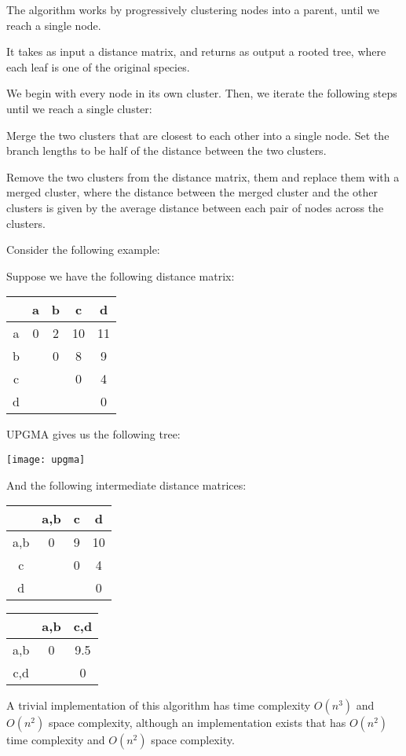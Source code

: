 \begin{enumerate}[label=(\alph*)]
The algorithm works by progressively clustering nodes into a parent, until we reach a single node.

It takes as input a distance matrix, and returns as output a rooted tree, where each leaf is one of the original species.

We begin with every node in its own cluster. Then, we iterate the following steps until we reach a single cluster:

Merge the two clusters that are closest to each other into a single node. Set the branch lengths to be half of the distance between the two clusters.

Remove the two clusters from the distance matrix, them and replace them with a merged cluster, where the distance between the merged cluster and the other clusters is given by the average distance between each pair of nodes across the clusters.

Consider the following example:

Suppose we have the following distance matrix:

\begin{tabular}{c|c|c|c|c}
  &a&b&c&d\\
  \hline
  a&0&2&10&11\\
  \hline
  b& &0&8&9\\
  \hline
  c& & &0&4\\
  \hline
  d& & & &0
\end{tabular}

UPGMA gives us the following tree:

\texttt{[image: upgma]}

And the following intermediate distance matrices:


\begin{tabular}{c|c|c|c}
  &a,b&c&d\\
  \hline
  a,b&0&9&10\\
  \hline
  c& &0&4\\
  \hline
  d& & &0
\end{tabular}

\begin{tabular}{c|c|c}
  &a,b&c,d\\
  \hline
  a,b&0&9.5\\
  \hline
  c,d& &0\\
\end{tabular}

A trivial implementation of this algorithm has time complexity $O(n^3)$ and $O(n^2)$ space complexity, although an implementation exists that has $O(n^2)$ time complexity and $O(n^2)$ space complexity.


\end{enumerate}
